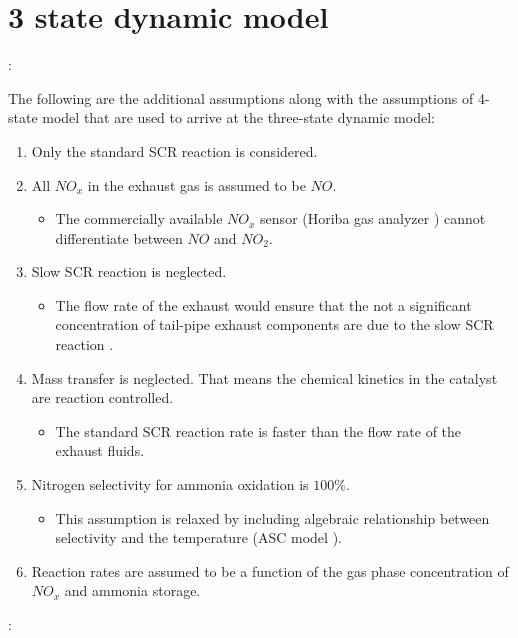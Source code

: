\section{3 state dynamic model}
:

The following are the additional assumptions along with the assumptions of
4-state model that are used to arrive at the three-state dynamic model\cite{devarakonda2009model}:
\begin{enumerate}
    \item Only the standard SCR reaction is considered.
    \item All $NO_x$ in the exhaust gas is assumed to be $NO$.
    \begin{itemize}
        \item The commercially available $NO_x$ sensor (Horiba gas analyzer \cite{nova2014urea}) cannot differentiate between $NO$ and $NO_2$.
    \end{itemize}
    \item Slow SCR reaction is neglected.
    \begin{itemize}
        \item The flow rate of the exhaust would ensure that the not a significant concentration of tail-pipe exhaust components are due to the slow SCR reaction \cite{nova2014urea}.
    \end{itemize}
    \item Mass transfer is neglected. That means the chemical kinetics in the catalyst are reaction controlled.
    \begin{itemize}
        \item The standard SCR reaction rate is faster than the flow rate of the exhaust fluids.
    \end{itemize}
    \item Nitrogen selectivity for ammonia oxidation is $100\%$.
    \begin{itemize}
        \item This assumption is relaxed by including algebraic relationship between selectivity and the temperature (ASC model \cite{jain2023diagnostics}).
    \end{itemize}
    \item Reaction rates are assumed to be a function of the gas phase concentration of $NO_x$ and ammonia storage.
\end{enumerate}

:

